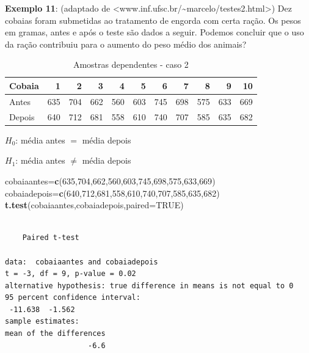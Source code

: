\documentclass[12pt,brazil,oneside]{book}
\newenvironment{Shaded}{\begin{snugshade}}{\end{snugshade}}
\newcommand{\DataTypeTok}[1]{\textcolor[rgb]{0.13,0.29,0.53}{#1}}
\newcommand{\DecValTok}[1]{\textcolor[rgb]{0.00,0.00,0.81}{#1}}
\newcommand{\KeywordTok}[1]{\textcolor[rgb]{0.13,0.29,0.53}{\textbf{#1}}}
\newcommand{\NormalTok}[1]{#1}
\newcommand{\OtherTok}[1]{\textcolor[rgb]{0.56,0.35,0.01}{#1}}
\begin{document}
\textbf{Exemplo 11}: (adaptado de \textless{}www.inf.ufsc.br/\textasciitilde{}marcelo/testes2.html\textgreater{}) Dez cobaias foram submetidas ao tratamento de engorda com certa ração. Os pesos em gramas, antes e após o teste são dados a seguir. Podemos concluir que o uso da ração contribuiu para o aumento do peso médio dos animais?

\begin{table}[t]

\caption{\label{tab:unnamed-chunk-124}Amostras dependentes - caso 2}
\centering
\begin{tabular}{l|r|r|r|r|r|r|r|r|r|r}
\hline
Cobaia & 1 & 2 & 3 & 4 & 5 & 6 & 7 & 8 & 9 & 10\\
\hline
Antes & 635 & 704 & 662 & 560 & 603 & 745 & 698 & 575 & 633 & 669\\
\hline
Depois & 640 & 712 & 681 & 558 & 610 & 740 & 707 & 585 & 635 & 682\\
\hline
\end{tabular}
\end{table}

\textbf{\(H_0\)}: média antes \(=\) média depois

\textbf{\(H_1\)}: média antes \(\neq\) média depois

\begin{Shaded}
\begin{Highlighting}[]
\NormalTok{cobaiaantes=}\KeywordTok{c}\NormalTok{(}\DecValTok{635}\NormalTok{,}\DecValTok{704}\NormalTok{,}\DecValTok{662}\NormalTok{,}\DecValTok{560}\NormalTok{,}\DecValTok{603}\NormalTok{,}\DecValTok{745}\NormalTok{,}\DecValTok{698}\NormalTok{,}\DecValTok{575}\NormalTok{,}\DecValTok{633}\NormalTok{,}\DecValTok{669}\NormalTok{)}
\NormalTok{cobaiadepois=}\KeywordTok{c}\NormalTok{(}\DecValTok{640}\NormalTok{,}\DecValTok{712}\NormalTok{,}\DecValTok{681}\NormalTok{,}\DecValTok{558}\NormalTok{,}\DecValTok{610}\NormalTok{,}\DecValTok{740}\NormalTok{,}\DecValTok{707}\NormalTok{,}\DecValTok{585}\NormalTok{,}\DecValTok{635}\NormalTok{,}\DecValTok{682}\NormalTok{)}
\KeywordTok{t.test}\NormalTok{(cobaiaantes,cobaiadepois,}\DataTypeTok{paired=}\OtherTok{TRUE}\NormalTok{)}
\end{Highlighting}
\end{Shaded}

\begin{verbatim}

    Paired t-test

data:  cobaiaantes and cobaiadepois
t = -3, df = 9, p-value = 0.02
alternative hypothesis: true difference in means is not equal to 0
95 percent confidence interval:
 -11.638  -1.562
sample estimates:
mean of the differences 
                   -6.6 
\end{verbatim}
\end{document}
